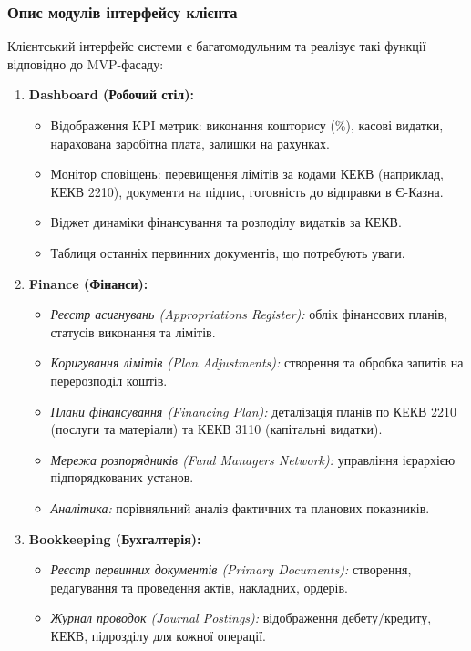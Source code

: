 \documentclass{article}
\begin{document}
\subsubsection{Опис модулів інтерфейсу клієнта}
Клієнтський інтерфейс системи є багатомодульним та реалізує такі функції відповідно до MVP-фасаду:
\begin{enumerate}
    \item \textbf{Dashboard (Робочий стіл):}
    \begin{itemize}
        \item Відображення KPI метрик: виконання кошторису (\%), касові видатки, нарахована заробітна плата, залишки на рахунках.
        \item Монітор сповіщень: перевищення лімітів за кодами КЕКВ (наприклад, КЕКВ 2210), документи на підпис, готовність до відправки в Є-Казна.
        \item Віджет динаміки фінансування та розподілу видатків за КЕКВ.
        \item Таблиця останніх первинних документів, що потребують уваги.
    \end{itemize}
    \item \textbf{Finance (Фінанси):}
    \begin{itemize}
        \item \emph{Реєстр асигнувань (Appropriations Register):} облік фінансових планів, статусів виконання та лімітів.
        \item \emph{Коригування лімітів (Plan Adjustments):} створення та обробка запитів на перерозподіл коштів.
        \item \emph{Плани фінансування (Financing Plan):} деталізація планів по КЕКВ 2210 (послуги та матеріали) та КЕКВ 3110 (капітальні видатки).
        \item \emph{Мережа розпорядників (Fund Managers Network):} управління ієрархією підпорядкованих установ.
        \item \emph{Аналітика:} порівняльний аналіз фактичних та планових показників.
    \end{itemize}
    \item \textbf{Bookkeeping (Бухгалтерія):}
    \begin{itemize}
        \item \emph{Реєстр первинних документів (Primary Documents):} створення, редагування та проведення актів, накладних, ордерів.
        \item \emph{Журнал проводок (Journal Postings):} відображення дебету/кредиту, КЕКВ, підрозділу для кожної операції.

\end{itemize}
\end{enumerate}
\end{document}
